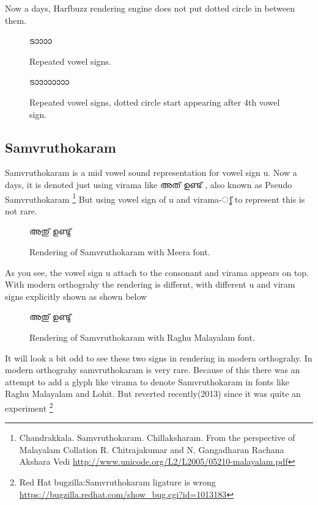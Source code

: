 Now a days, Harfbuzz rendering engine does not put dotted circle in between them.

\begin{figure}[h!]
  \centering
  {\meera\textexample ടാാാാ}\\
  \caption{Repeated vowel signs.}
\end{figure}

\begin{figure}[h!]
  \centering
  {\meera\textexample ടാാാാാാാാ}\\
  \caption{Repeated vowel signs, dotted circle start appearing after 4th vowel sign.}
\end{figure}


\subsection {Samvruthokaram}

Samvruthokaram is a mid vowel sound representation for vowel sign u. Now a 
days, it is denoted just using virama like {\malayalam അത് ഉണ്ട് }, also known as 
Pseudo Samvruthokaram
\footnote{Chandrakkala. Samvruthokaram. Chillaksharam.
From the perspective of Malayalam Collation
R. Chitrajakumar and N. Gangadharan
Rachana Akshara Vedi \url{http://www.unicode.org/L2/L2005/05210-malayalam.pdf}}
But using vowel sign of u and virama-{\malayalam ു്} to represent this is not 
rare.

\begin{figure}[h]
  \centering
  {\meera\textexample  അതു് ഉണ്ടു് }\\
  \caption{Rendering of Samvruthokaram with Meera font.}
\end{figure}

As you see, the vowel sign u attach to the consonant and virama appears on top.
With modern orthograhy the rendering is differnt, with different u and viram 
signs explicitly shown as shown below

\begin{figure}[h]
  \centering
  {\raghumalayalam\textexample  അതു് ഉണ്ടു് }\\
  \caption{Rendering of Samvruthokaram with Raghu Malayalam font.}
\end{figure}

It will look a bit odd to see these two signs in rendering in modern 
orthograhy. In modern orthograhy samvruthokaram is very rare. 
Because of this there was an attempt to add a glyph like virama to denote 
Samvruthokaram in fonts like Raghu Malayalam and Lohit.
But reverted recently(2013) since it was quite an experiment
\footnote{Red Hat bugzilla:Samvruthokaram ligature is wrong 
\url{https://bugzilla.redhat.com/show_bug.cgi?id=1013183}}

